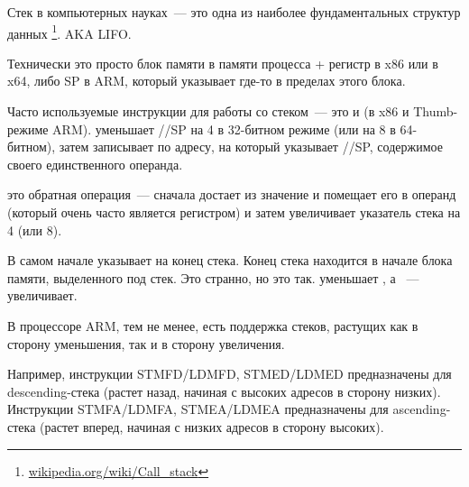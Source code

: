 \mysection{\Stack}
\label{sec:stack}
\myindex{\Stack}

Стек в компьютерных науках~--- это одна из наиболее фундаментальных структур данных
\footnote{\href{http://go.yurichev.com/17119}{wikipedia.org/wiki/Call\_stack}}.
\ac{AKA} \ac{LIFO}.

Технически это просто блок памяти в памяти процесса + регистр \ESP в x86 или \RSP в x64, либо \ac{SP} в ARM, который указывает где-то в пределах этого блока.

Часто используемые инструкции для работы со стеком~--- это \PUSH и \POP (в x86 и Thumb-режиме ARM). 
\PUSH уменьшает \ESP/\RSP/\ac{SP} на 4 в 32-битном режиме (или на 8 в 64-битном),
затем записывает по адресу, на который указывает \ESP/\RSP/\ac{SP}, содержимое своего единственного операнда.

\POP это обратная операция~--- сначала достает из  значение и помещает его в операнд 
(который очень часто является регистром) и затем увеличивает указатель стека на 4 (или 8).

В самом начале  указывает на конец стека.
Конец стека находится в начале блока памяти, выделенного под стек. Это странно, но это так.
\PUSH уменьшает , а \POP~--- увеличивает.

В процессоре ARM, тем не менее, есть поддержка стеков, растущих как в сторону уменьшения, так и в сторону увеличения.


Например, инструкции \ac{STMFD}/\ac{LDMFD}, \ac{STMED}/\ac{LDMED} предназначены для descending-стека (растет назад, начиная с высоких адресов в сторону низких).\\
Инструкции \ac{STMFA}/\ac{LDMFA}, \ac{STMEA}/\ac{LDMEA} предназначены для ascending-стека (растет вперед, начиная с низких адресов в сторону высоких).


